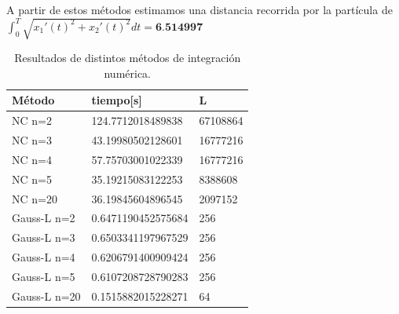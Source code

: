\documentclass{article}
\begin{document}
    \indent A partir de estos métodos estimamos una distancia recorrida por la partícula de \(\int_{0}^{T} \sqrt{x_1'(t)^2+x_2'(t)^2}dt=\textbf{6.514997}\)
    \begin{table}[h]
        \centering
        \begin{tabular}{|l|l|l|}
            \hline
            \textbf{Método} & \textbf{tiempo{[}s{]}} & \textbf{L} \\ \hline
            NC n=2          & 124.7712018489838      & 67108864   \\ \hline
            NC n=3          & 43.19980502128601      & 16777216   \\ \hline
            NC n=4          & 57.75703001022339      & 16777216   \\ \hline
            NC n=5          & 35.19215083122253      & 8388608    \\ \hline
            NC n=20         & 36.19845604896545      & 2097152    \\ \hline
            Gauss-L n=2     & 0.6471190452575684     & 256        \\ \hline
            Gauss-L n=3     & 0.6503341197967529     & 256        \\ \hline
            Gauss-L n=4     & 0.6206791400909424     & 256        \\ \hline
            Gauss-L n=5     & 0.6107208728790283     & 256        \\ \hline
            Gauss-L n=20    & 0.1515882015228271     & 64         \\ \hline
        \end{tabular}
        \caption{Resultados de distintos métodos de integración numérica.}
        \label{Tabla}
    \end{table}
\end{document}
